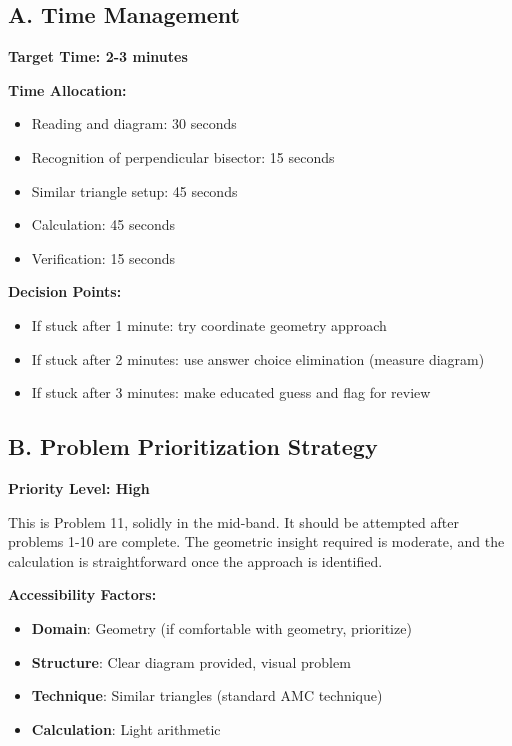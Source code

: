 \documentclass[12pt]{article}
\begin{document}
\begin{competitionbox}
\subsection*{A. Time Management}

\textbf{Target Time: 2-3 minutes}

\textbf{Time Allocation:}
\begin{itemize}
    \item Reading and diagram: 30 seconds
    \item Recognition of perpendicular bisector: 15 seconds
    \item Similar triangle setup: 45 seconds
    \item Calculation: 45 seconds
    \item Verification: 15 seconds
\end{itemize}

\textbf{Decision Points:}
\begin{itemize}
    \item If stuck after 1 minute: try coordinate geometry approach
    \item If stuck after 2 minutes: use answer choice elimination (measure diagram)
    \item If stuck after 3 minutes: make educated guess and flag for review
\end{itemize}

\subsection*{B. Problem Prioritization Strategy}

\textbf{Priority Level: High}

This is Problem 11, solidly in the mid-band. It should be attempted after problems 1-10 are complete. The geometric insight required is moderate, and the calculation is straightforward once the approach is identified.

\textbf{Accessibility Factors:}
\begin{itemize}
    \item \textbf{Domain}: Geometry (if comfortable with geometry, prioritize)
    \item \textbf{Structure}: Clear diagram provided, visual problem
    \item \textbf{Technique}: Similar triangles (standard AMC technique)
    \item \textbf{Calculation}: Light arithmetic
\end{itemize}


\end{competitionbox}
\end{document}
